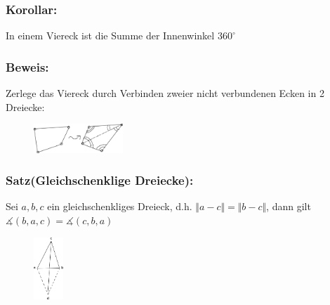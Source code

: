 \subsubsection{Korollar:}
In einem Viereck ist die Summe der Innenwinkel $360^{\circ}$
%
%
%
\subsubsection{Beweis:}
Zerlege das Viereck durch Verbinden zweier nicht verbundenen Ecken in 2 Dreiecke:
%
 \begin{figure}[H]
 \centering
\includegraphics[width=0.3\textwidth]{mainmatter/chapter1/pics/winkeladd.png}
\end{figure}
%
\subsubsection{Satz(Gleichschenklige Dreiecke):}
Sei $a,b,c$ ein gleichschenkliges Dreieck, d.h. $\Vert a-c \Vert = \Vert b-c \Vert$, dann gilt $\measuredangle (b,a,c) = \measuredangle (c,b,a)$
%
 \begin{figure}[H]
 \centering
\includegraphics[width=0.1\textwidth]{mainmatter/chapter1/pics/para.png}
\end{figure}
%
